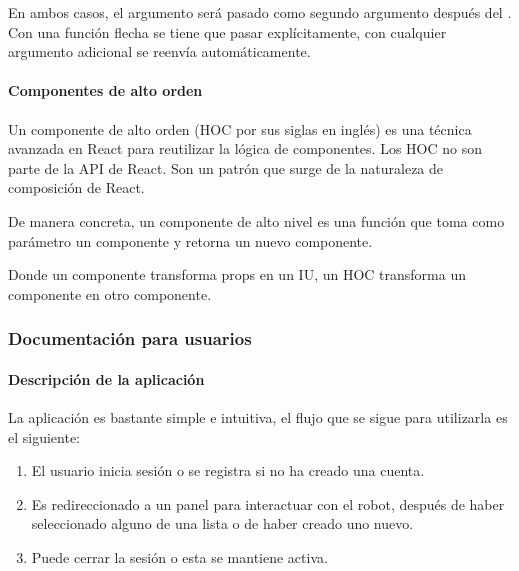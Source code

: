 En ambos casos, el argumento  será pasado como segundo argumento después
del . Con una función flecha se tiene que pasar explícitamente, con
 cualquier argumento adicional se reenvía automáticamente.


\paragraph{Componentes de alto orden}
\label{\detokenize{reactjs:componentes-de-alto-orden}}
Un componente de alto orden (HOC por sus siglas en inglés) es una técnica
avanzada en React para reutilizar la lógica de componentes. Los HOC no son
parte de la API de React. Son un patrón que surge de la naturaleza de
composición  de React.

De manera concreta, un componente de alto nivel es una función que toma como
parámetro un componente y retorna un nuevo componente.

%
\begin{sphinxVerbatim}[commandchars=\\\{\}]
   
\end{sphinxVerbatim}

Donde un componente transforma props en un IU, un HOC transforma un
componente en otro componente.


\subsubsection{Documentación para usuarios}
\label{\detokenize{users_docs:documentacion-para-usuarios}}

\paragraph{Descripción de la aplicación}
\label{\detokenize{descripcion-de-la-aplicacion}}
La aplicación es bastante simple e intuitiva, el flujo que se sigue para
utilizarla es el siguiente:
\begin{enumerate}
\item {} 
El usuario inicia sesión o se registra si no ha creado una cuenta.

\item {} 
Es redireccionado a un panel para interactuar con el robot, después de haber seleccionado alguno de una lista o de haber creado uno nuevo.

\item {} 
Puede cerrar la sesión o esta se mantiene activa.

\end{enumerate}

